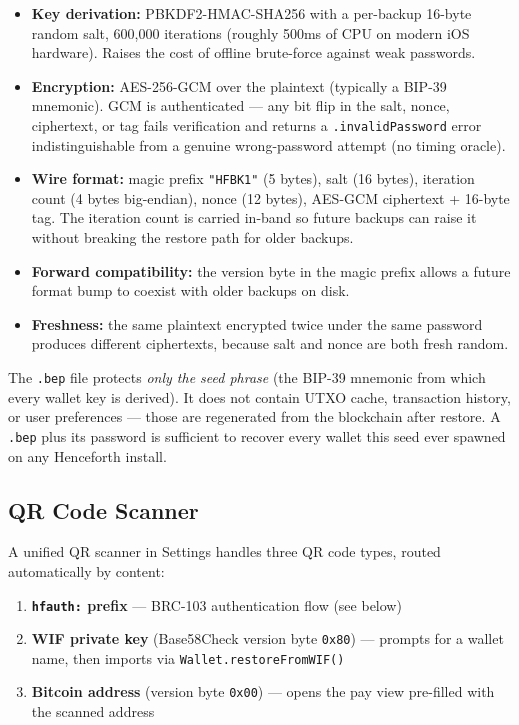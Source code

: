 \documentclass[a4paper, 11pt, openany]{book}
\begin{document}
\begin{itemize}
\item \textbf{Key derivation:} PBKDF2-HMAC-SHA256 with a per-backup 16-byte random salt, 600{,}000 iterations (roughly 500ms of CPU on modern iOS hardware). Raises the cost of offline brute-force against weak passwords.
\item \textbf{Encryption:} AES-256-GCM over the plaintext (typically a BIP-39 mnemonic). GCM is authenticated --- any bit flip in the salt, nonce, ciphertext, or tag fails verification and returns a \texttt{.invalidPassword} error indistinguishable from a genuine wrong-password attempt (no timing oracle).
\item \textbf{Wire format:} magic prefix \texttt{"HFBK1"} (5 bytes), salt (16 bytes), iteration count (4 bytes big-endian), nonce (12 bytes), AES-GCM ciphertext + 16-byte tag. The iteration count is carried in-band so future backups can raise it without breaking the restore path for older backups.
\item \textbf{Forward compatibility:} the version byte in the magic prefix allows a future format bump to coexist with older backups on disk.
\item \textbf{Freshness:} the same plaintext encrypted twice under the same password produces different ciphertexts, because salt and nonce are both fresh random.
\end{itemize}

\begin{notebox}
The \texttt{.bep} file protects \emph{only the seed phrase} (the BIP-39 mnemonic from which every wallet key is derived). It does not contain UTXO cache, transaction history, or user preferences --- those are regenerated from the blockchain after restore. A \texttt{.bep} plus its password is sufficient to recover every wallet this seed ever spawned on any Henceforth install.
\end{notebox}

\subsection{QR Code Scanner}

A unified QR scanner in Settings handles three QR code types, routed automatically by content:

\begin{enumerate}
\item \textbf{\texttt{hfauth:} prefix} --- BRC-103 authentication flow (see below)
\item \textbf{WIF private key} (Base58Check version byte \texttt{0x80}) --- prompts for a wallet name, then imports via \texttt{Wallet.restoreFromWIF()}
\item \textbf{Bitcoin address} (version byte \texttt{0x00}) --- opens the pay view pre-filled with the scanned address
\end{enumerate}
\end{document}
